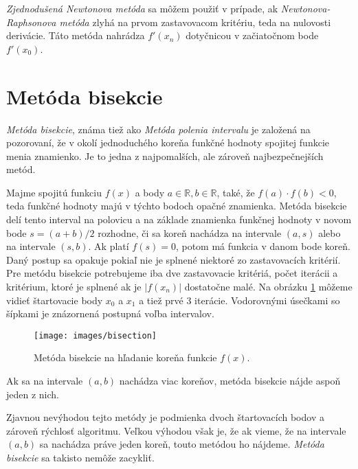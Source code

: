 \textit{Zjednodušená Newtonova metóda} sa môžem použiť v prípade, ak \textit{Newtonova-Raphsonova metóda} zlyhá na prvom 
zastavovacom kritériu, teda na nulovosti derivácie. Táto metóda nahrádza $f'(x_n)$ dotyčnicou v začiatočnom bode $f'(x_0)$.  
\fi

\section{Metóda bisekcie}

\textit{Metóda bisekcie}, známa tiež ako \textit{Metóda polenia intervalu} je založená 
na pozorovaní, že v okolí jednoduchého koreňa funkčné hodnoty spojitej funkcie menia znamienko. 
Je to jedna z najpomalších, ale zároveň najbezpečnejších metód.

Majme spojitú funkciu $f(x)$ a body $a \in \mathbb{R}, b \in \mathbb{R}$, také, že $f(a) \cdot f(b) < 0$, teda 
funkčné hodnoty majú v týchto bodoch opačné znamienka. Metóda bisekcie delí tento 
interval na polovicu a na základe znamienka funkčnej hodnoty v novom bode $s = (a+b)/2$
rozhodne, či sa koreň nachádza na intervale $(a, s)$ alebo na intervale $(s, b)$. 
Ak platí $f(s) = 0$, potom má funkcia v danom bode koreň. Daný postup sa opakuje
pokiaľ nie je splnené niektoré zo zastavovacích kritérií. Pre metódu bisekcie potrebujeme 
iba dve zastavovacie kritériá, počet iterácii a kritérium, ktoré je splnené ak 
je $|f(x_n)|$ dostatočne malé.
Na obrázku \ref{obr:bisection}
môžeme vidieť štartovacie body $x_0$ a $x_1$ a tiež prvé 3 iterácie. Vodorovnými
úsečkami so šípkami je znázornená postupná voľba intervalov. 

\begin{figure}
    \centerline{\texttt{[image: images/bisection]}}
    \caption[Metóda bisekcie]{Metóda bisekcie na hľadanie koreňa funkcie $f(x)$.}
    \label{obr:bisection}
\end{figure}

Ak sa na intervale $(a, b)$ nachádza viac koreňov, metóda bisekcie nájde aspoň jeden z nich.

Zjavnou nevýhodou tejto metódy je podmienka dvoch štartovacích bodov a zároveň rýchlosť algoritmu. 
Veľkou výhodou však je, že ak vieme, že na intervale $(a, b)$ sa nachádza práve jeden koreň, 
touto metódou ho nájdeme. \textit{Metóda bisekcie} sa takisto nemôže zacykliť.

